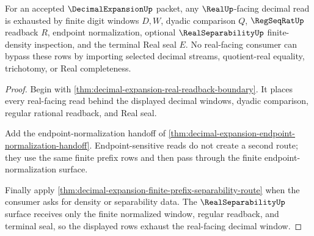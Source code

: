\begin{theorem}
\label{thm:decimal-expansion-real-window-exhaustion}
For an accepted $\DecimalExpansionUp$ packet, any $\RealUp$-facing decimal read is exhausted by finite digit windows $D,W$, dyadic comparison $Q$, $\RegSeqRatUp$ readback $R$, endpoint normalization, optional $\RealSeparabilityUp$ finite-density inspection, and the terminal Real seal $E$. No real-facing consumer can bypass these rows by importing selected decimal streams, quotient-real equality, trichotomy, or Real completeness.
\end{theorem}
\begin{proof}
Begin with \autoref{thm:decimal-expansion-real-readback-boundary}. It places every real-facing read behind the displayed decimal windows, dyadic comparison, regular rational readback, and Real seal.

Add the endpoint-normalization handoff of \autoref{thm:decimal-expansion-endpoint-normalization-handoff}. Endpoint-sensitive reads do not create a second route; they use the same finite prefix rows and then pass through the finite endpoint-normalization surface.

Finally apply \autoref{thm:decimal-expansion-finite-prefix-separability-route} when the consumer asks for density or separability data. The $\RealSeparabilityUp$ surface receives only the finite normalized window, regular readback, and terminal seal, so the displayed rows exhaust the real-facing decimal window.
\end{proof}


